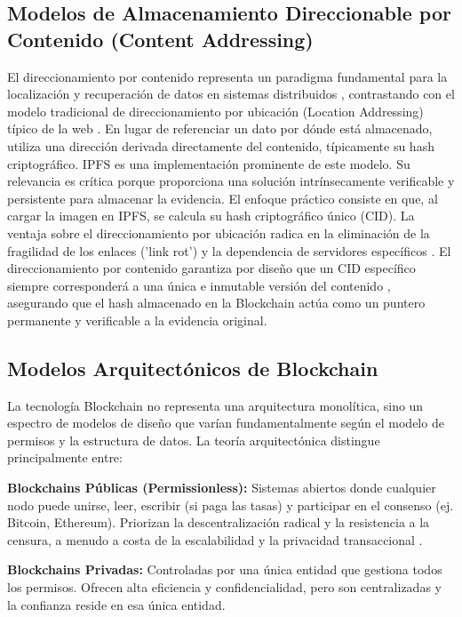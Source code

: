 \documentclass[
    letterpaper, 
    man,   
    spanish,
    12pt,
    donotrepeattitle,
    floatsintext,
    hidelinks %
]{apa7}
\begin{document}
  
\subsection{Modelos de Almacenamiento Direccionable por Contenido (Content Addressing)} 

El direccionamiento por contenido representa un paradigma fundamental para la localización y recuperación de datos en sistemas distribuidos \parencite{voigt2017gdpr}, contrastando con el modelo tradicional de direccionamiento por ubicación (Location Addressing) típico de la web \parencite{fielding2000architectural}. En lugar de referenciar un dato por dónde está almacenado, utiliza una dirección derivada directamente del contenido, típicamente su hash criptográfico. IPFS \parencite{benet2014ipfs} es una implementación prominente de este modelo. Su relevancia es crítica porque proporciona una solución intrínsecamente verificable y persistente para almacenar la evidencia. El enfoque práctico consiste en que, al cargar la imagen en IPFS, se calcula su hash criptográfico único (CID). La ventaja sobre el direccionamiento por ubicación radica en la eliminación de la fragilidad de los enlaces ('link rot') y la dependencia de servidores específicos \parencite{voigt2017gdpr}. El direccionamiento por contenido garantiza por diseño que un CID específico siempre corresponderá a una única e inmutable versión del contenido \parencite{benet2014ipfs}, asegurando que el hash almacenado en la Blockchain actúa como un puntero permanente y verificable a la evidencia original. 

\subsection{ Modelos Arquitectónicos de Blockchain} 
La tecnología Blockchain no representa una arquitectura monolítica, sino un espectro de modelos de diseño que varían fundamentalmente según el modelo de permisos y la estructura de datos. La teoría arquitectónica distingue principalmente entre: 

\textbf{Blockchains Públicas (Permissionless):} Sistemas abiertos donde cualquier nodo puede unirse, leer, escribir (si paga las tasas) y participar en el consenso (ej. Bitcoin, Ethereum). Priorizan la descentralización radical y la resistencia a la censura, a menudo a costa de la escalabilidad y la privacidad transaccional \parencite{nakamoto2008bitcoin}. 

\textbf{Blockchains Privadas:} Controladas por una única entidad que gestiona todos los permisos. Ofrecen alta eficiencia y confidencialidad, pero son centralizadas y la confianza reside en esa única entidad. 
\end{document}
